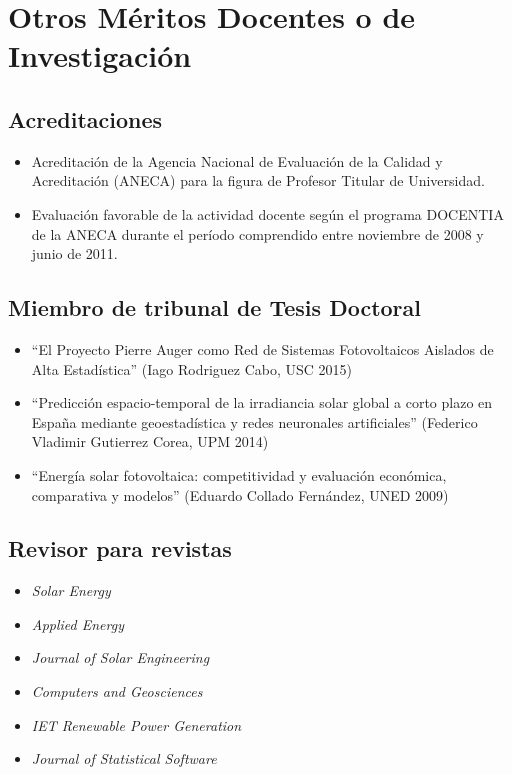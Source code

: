 \documentclass[article, a4paper]{memoir}
\begin{document}
\section{Otros Méritos Docentes o de Investigación}
\label{sec:orgcba5cbd}

\subsection{Acreditaciones}
\label{sec:org6e2910f}

\begin{itemize}
\item Acreditación de la Agencia Nacional de Evaluación de la Calidad y Acreditación (ANECA) para la figura de Profesor Titular de Universidad.
\end{itemize}

\begin{itemize}
\item Evaluación favorable de la actividad docente según el programa DOCENTIA de la ANECA durante el período comprendido entre noviembre de 2008 y junio de 2011.
\end{itemize}

\subsection{Miembro de tribunal de Tesis Doctoral}
\label{sec:org7105f0c}

\begin{itemize}
\item ``El Proyecto Pierre Auger como Red de Sistemas Fotovoltaicos Aislados de Alta Estadística'' (Iago Rodriguez Cabo, USC 2015)

\item ``Predicción espacio-temporal de la irradiancia solar global a corto plazo en España mediante geoestadística y redes neuronales artificiales'' (Federico Vladimir Gutierrez Corea, UPM 2014)

\item ``Energía solar fotovoltaica: competitividad y evaluación económica, comparativa y modelos'' (Eduardo Collado Fernández, UNED 2009)
\end{itemize}

\subsection{Revisor para revistas}
\label{sec:orgb6ee898}

\begin{itemize}
\item \emph{Solar Energy}

\item \emph{Applied Energy}

\item \emph{Journal of Solar Engineering}

\item \emph{Computers and Geosciences}

\item \emph{IET Renewable Power Generation}

\item \emph{Journal of Statistical Software}
\end{itemize}
\end{document}
